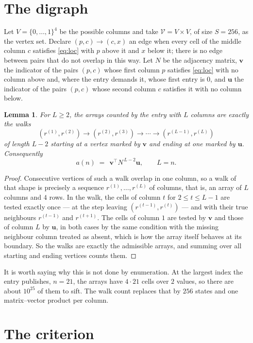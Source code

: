 \documentclass[11pt,a4paper]{article}
\theoremstyle{plain}
\newtheorem{lemma}[theorem]{Lemma}
\theoremstyle{definition}
\begin{document}
\section{The digraph}

Let $V=\{0,\dots,1\}^{4}$ be the possible columns and take
$\mathcal V=V\times V$, of size $S=256$, as the vertex set. Declare $(p,c)\to(c,x)$ an edge
when every cell of the middle column $c$ satisfies \eqref{eq:loc} with $p$ above it and $x$
below it; there is no edge between pairs that do not overlap in this way. Let $N$ be the
adjacency matrix, $\mathbf{v}$ the indicator of the pairs $(p,c)$ whose first column $p$
satisfies \eqref{eq:loc} with no column above and, where the entry demands it, whose first entry is $0$, and $\mathbf{u}$ the indicator of
the pairs $(p,c)$ whose second column $c$ satisfies it with no column below.

\begin{lemma}\label{lem:walk}
For $L\ge2$, the arrays counted by the entry with $L$ columns are exactly the walks
\[
(r^{(1)},r^{(2)})\to(r^{(2)},r^{(3)})\to\cdots\to(r^{(L-1)},r^{(L)})
\]
of length $L-2$ starting at a vertex marked by $\mathbf{v}$ and ending at one marked by
$\mathbf{u}$. Consequently
\[
a(n)\;=\;\,\mathbf{v}^{\!\top}N^{\,L-2}\mathbf{u},\qquad L=n .
\]
\end{lemma}

\begin{proof}
Consecutive vertices of such a walk overlap in one column, so a walk of that shape is
precisely a sequence $r^{(1)},\dots,r^{(L)}$ of columns, that is, an array of $L$ columns
and $4$ rows. In the walk, the cells of column $t$ for $2\le t\le L-1$ are tested
exactly once --- at the step leaving $(r^{(t-1)},r^{(t)})$ --- and with their true
neighbours $r^{(t-1)}$ and $r^{(t+1)}$. The cells of column $1$ are tested by
$\mathbf{v}$ and those of column $L$ by $\mathbf{u}$, in both cases by the same condition
with the missing neighbour column treated as absent, which is how the array itself behaves at
its boundary. So the walks are exactly the admissible arrays, and summing over all starting
and ending vertices counts them.
\end{proof}


It is worth saying why this is not done by enumeration. At the largest index the entry
publishes, $n=21$, the arrays have $4\cdot21$ cells over
$2$ values, so there are about $10^{25}$ of them to sift. The
walk count replaces that by $256$ states and one matrix--vector product per column.
\section{The criterion}
\end{document}
